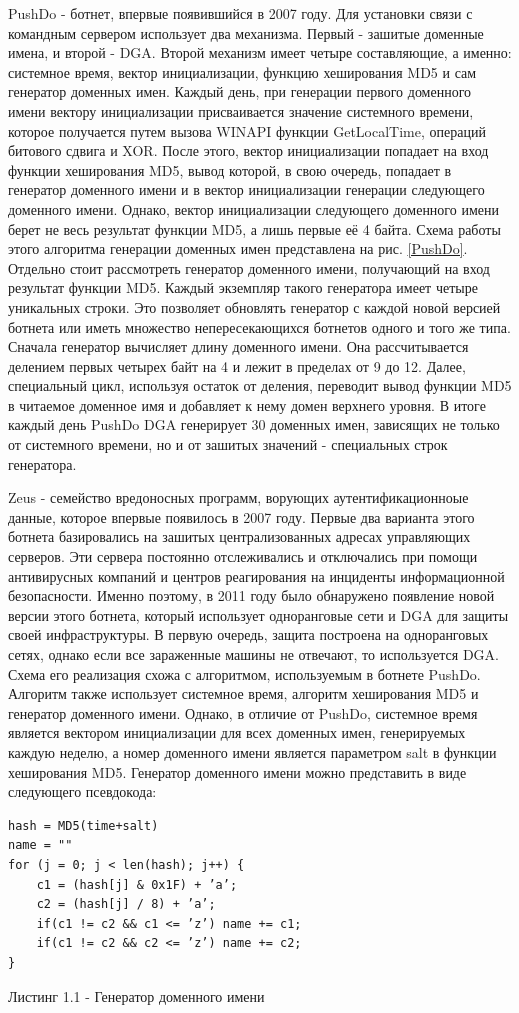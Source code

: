 PushDo - ботнет, впервые появившийся в 2007 году. Для установки связи с командным сервером использует два механизма. Первый - зашитые доменные имена, и второй - DGA. Второй механизм имеет четыре составляющие, а именно: системное время, вектор инициализации, функцию хеширования MD5 и сам генератор доменных имен. Каждый день, при генерации первого доменного имени вектору инициализации присваивается значение системного времени, которое получается путем вызова WINAPI функции GetLocalTime, операций битового сдвига и XOR. После этого, вектор инициализации попадает на вход функции хеширования MD5, вывод которой, в свою очередь, попадает в генератор доменного имени и в вектор инициализации генерации следующего доменного имени. Однако, вектор инициализации следующего доменного имени берет не весь результат функции MD5, а лишь первые её 4 байта. Схема работы этого алгоритма генерации доменных имен представлена на рис. \ref{PushDo}.
Отдельно стоит рассмотреть генератор доменного имени, получающий на вход результат функции MD5. Каждый экземпляр такого генератора имеет четыре уникальных строки. Это позволяет обновлять генератор с каждой новой версией ботнета или иметь множество непересекающихся ботнетов одного и того же типа. Сначала генератор вычисляет длину доменного имени. Она рассчитывается делением первых четырех байт на 4 и лежит в пределах от 9 до 12. Далее, специальный цикл, используя остаток от деления, переводит вывод функции MD5 в читаемое доменное имя и добавляет к нему домен верхнего уровня. В итоге каждый день PushDo DGA генерирует 30 доменных имен, зависящих не только от системного времени, но и от зашитых значений - специальных строк генератора.

Zeus - семейство вредоносных программ, ворующих аутентификационноые данные, которое впервые появилось в 2007 году. Первые два варианта этого ботнета базировались на зашитых централизованных адресах управляющих серверов. Эти сервера постоянно отслеживались и отключались при помощи антивирусных компаний и центров реагирования на инциденты информационной безопасности. Именно поэтому, в 2011 году было обнаружено появление новой версии этого ботнета, который использует одноранговые сети и DGA для защиты своей инфраструктуры. В первую очередь, защита построена на одноранговых сетях, однако если все зараженные машины не отвечают, то используется DGA. Схема его реализация схожа с алгоритмом, используемым в ботнете PushDo. Алгоритм также использует системное время, алгоритм хеширования MD5 и генератор доменного имени. Однако, в отличие от PushDo, системное время является вектором инициализации для всех доменных имен, генерируемых каждую неделю, а номер доменного имени является параметром salt в функции хеширования MD5. Генератор доменного имени можно представить в виде следующего псевдокода:
\clearpage
\begin{lstlisting}
hash = MD5(time+salt)
name = ""
for (j = 0; j < len(hash); j++) {
    c1 = (hash[j] & 0x1F) + ’a’;
    c2 = (hash[j] / 8) + ’a’;
    if(c1 != c2 && c1 <= ’z’) name += c1;
    if(c1 != c2 && c2 <= ’z’) name += c2;
}
\end{lstlisting}
Листинг 1.1 - Генератор доменного имени

